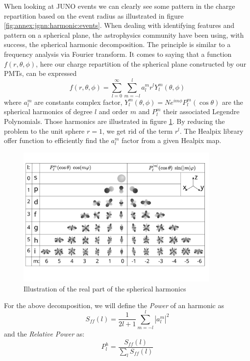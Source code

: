 \documentclass[../main.tex]{subfiles}
\begin{document}
When looking at JUNO events we can clearly see some pattern in the charge repartition based on the event radius as illustrated in figure \ref{fig:annex:jgnn:harmonic:events}. When dealing with identifying features and pattern on a spherical plane, the astrophysics community have been using, with success, the spherical harmonic decomposition. The principle is similar to a frequency analysis via Fourier transform. It comes to saying that a function $f(r, \theta, \phi)$, here our charge repartition of the spherical plane constructed by our PMTs, can be expressed
\begin{equation}
  f(r, \theta, \phi) = \sum_{l=0}^{\infty} \sum_{m=-l}^l a^m_l r^l Y^m_l(\theta, \phi)
\end{equation}
where $a^m_l$ are constants complex factor, $Y^m_l(\theta, \phi) = Ne^{im\phi}P^m_l(\cos\theta)$ are the spherical harmonics of degree $l$ and order $m$ and $P^m_l$ their associated Legendre Polynomials. Those harmonics are illustrated in figure \ref{fig:annex:jgnn:harmonic:ill}. By reducing the problem to the unit sphere $r=1$, we get rid of the term $r^l$. The Healpix library \cite{gorski_healpix_2005} offer function to efficiently find the $a^m_l$ factor from a given Healpix map.

\begin{figure}
  \centering
  \includegraphics[height=7cm]{images/jgnn/harmonic/harmonics_ill.png}
  \caption{Illustration of the real part of the spherical harmonics}
  \label{fig:annex:jgnn:harmonic:ill}
\end{figure}

For the above decomposition, we will define the \textit{Power} of an harmonic as
\begin{equation}
  S_{ff}(l) = \frac{1}{2l + 1} \sum_{m=-l}^l |a_l^m|^2
\end{equation}
and the \textit{Relative Power} as:
\begin{equation}
  P^h_l = \frac{S_{ff}(l)}{\sum_l S_{ff}(l)}
\end{equation}
\end{document}
